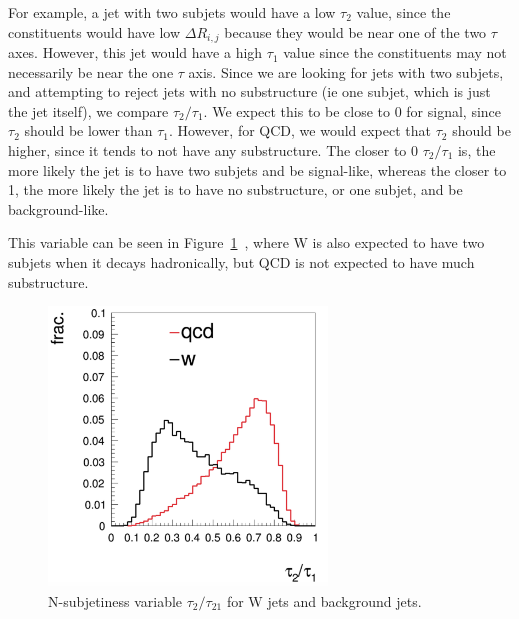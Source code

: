 For example, a jet with two subjets would have a low $\tau_{2}$ value, since the constituents would have low $\Delta R_{i,j}$ because they would be near one of the two $\tau$ axes. However, this jet would have a high $\tau_{1}$ value since the constituents may not necessarily be near the one $\tau$ axis. Since we are looking for jets with two subjets, and attempting to reject jets with no substructure (ie one subjet, which is just the jet itself), we compare $\tau_2/\tau_1$. We expect this to be close to 0 for signal, since $\tau_{2}$ should be lower than $\tau_{1}$. However, for QCD, we would expect that $\tau_{2}$ should be higher, since it tends to not have any substructure. The closer to 0 $\tau_2/\tau_1$ is, the more likely the jet is to have two subjets and be signal-like, whereas the closer to 1, the more likely the jet is to have no substructure, or one subjet, and be background-like.

This variable can be seen in Figure~\ref{Fig:tau21}~\cite{Khanpour:2014xla}, where W is also expected to have two subjets when it decays hadronically, but QCD is not expected to have much substructure.
\begin{figure}[h!]
    \centering
        \includegraphics[width=0.66\textwidth]{F4/tau21.png}
        \caption{N-subjetiness variable $\tau_2/\tau_21$ for W jets and background jets.}
        \label{Fig:tau21}
\end{figure}
\vspace{5mm}

